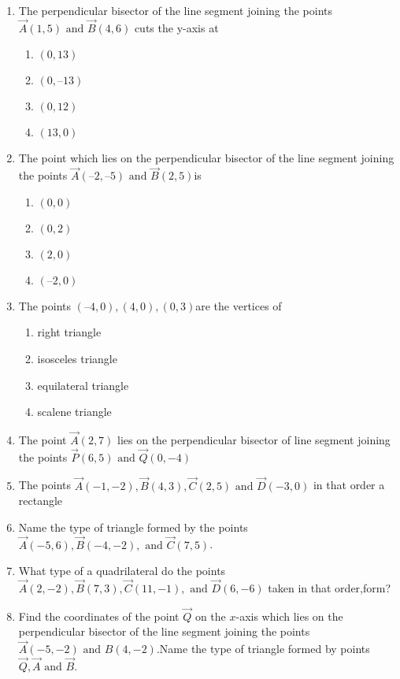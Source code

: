 \begin{enumerate}[label=\thesection.\arabic*,ref=\thesection.\theenumi]
\item The perpendicular bisector of the line segment joining the points $\vec{A} (1, 5) \text{ and }
\vec{B} (4, 6)$ cuts the y-axis at
\begin{enumerate}
	\item$(0, 13)$ 
	\item $(0, –13)$
	\item$(0, 12) $
	\item$(13, 0)$
\end{enumerate}
\item The point which lies on the perpendicular bisector of the line segment joining the
	points $\vec{A} (–2, –5)\text { and } \vec{B} (2, 5) $is
\begin{enumerate}
\item  	$(0, 0)$
\item  $(0, 2)$ 
\item  $(2, 0)$ 
\item  $(–2, 0)$
\end{enumerate}
\item The points $ (–4, 0), (4, 0), (0, 3) $are the vertices of
	\begin{enumerate}
\item right triangle 
\item isosceles triangle
\item  equilateral triangle
\item  scalene triangle 
\end{enumerate}
\item The point $\vec{A}(2,7)$ lies on the perpendicular bisector of line segment joining the points $\vec{P}(6,5)\text{ and } \vec{Q}(0,-4)$
\item The points $\vec{A}(-1,-2),\vec{B}(4,3),\vec{C}(2,5) \text{ and } \vec{D}(-3,0)$ in that order a rectangle
\item Name the type of triangle formed by the points $\vec{A}(-5,6),\vec{B}(-4,-2),\text{ and }\vec{C}(7,5)$.
\item What type of a quadrilateral do the points $\vec{A}(2,-2),\vec{B}(7,3),\vec{C}(11,-1),\text{ and }\vec{D}(6,-6)$ taken in that order,form?
\item Find the coordinates of the point $\vec{Q}$ on the $x$-axis which lies on the perpendicular bisector of the line segment joining the points $\vec{A}(-5,-2) \text{ and }{B}(4,-2)$.Name the type of triangle formed by points $\vec{Q},\vec{A}\text{ and }\vec{B}$.

\end{enumerate}
